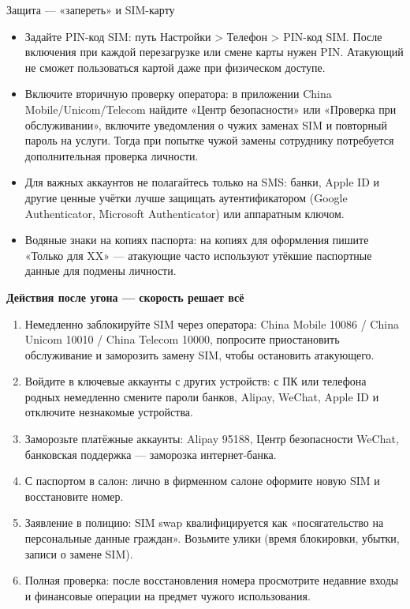 \begin{tcbwarn}{Защита — «запереть» и SIM-карту}
\begin{itemize}
  \item Задайте PIN-код SIM: путь Настройки > Телефон > PIN-код SIM. После включения при каждой перезагрузке или смене карты нужен PIN. Атакующий не сможет пользоваться картой даже при физическом доступе.
  \item Включите вторичную проверку оператора: в приложении China Mobile/Unicom/Telecom найдите «Центр безопасности» или «Проверка при обслуживании», включите уведомления о чужих заменах SIM и повторный пароль на услуги. Тогда при попытке чужой замены сотруднику потребуется дополнительная проверка личности.
  \item Для важных аккаунтов не полагайтесь только на SMS: банки, Apple ID и другие ценные учётки лучше защищать аутентификатором (Google Authenticator, Microsoft Authenticator) или аппаратным ключом.
  \item Водяные знаки на копиях паспорта: на копиях для оформления пишите «Только для XX» — атакующие часто используют утёкшие паспортные данные для подмены личности.
\end{itemize}

\end{tcbwarn}

\textbf{Действия после угона — скорость решает всё}\par

\begin{enumerate}
  \item Немедленно заблокируйте SIM через оператора: China Mobile 10086 / China Unicom 10010 / China Telecom 10000, попросите приостановить обслуживание и заморозить замену SIM, чтобы остановить атакующего.
  \item Войдите в ключевые аккаунты с других устройств: с ПК или телефона родных немедленно смените пароли банков, Alipay, WeChat, Apple ID и отключите незнакомые устройства.
  \item Заморозьте платёжные аккаунты: Alipay 95188, Центр безопасности WeChat, банковская поддержка — заморозка интернет-банка.
  \item С паспортом в салон: лично в фирменном салоне оформите новую SIM и восстановите номер.
  \item Заявление в полицию: SIM swap квалифицируется как «посягательство на персональные данные граждан». Возьмите улики (время блокировки, убытки, записи о замене SIM).
  \item Полная проверка: после восстановления номера просмотрите недавние входы и финансовые операции на предмет чужого использования.
\end{enumerate}

